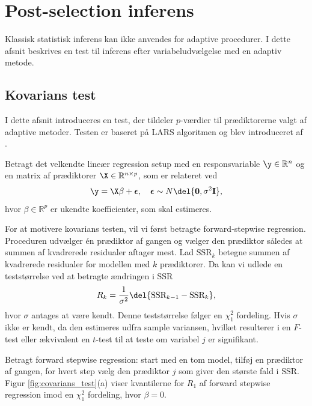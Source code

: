 \section{Post-selection inferens}
Klassisk statistisk inferens kan ikke anvendes for adaptive procedurer.
I dette afsnit beskrives en test til inferens efter variabeludvælgelse med en adaptiv metode.


\subsection{Kovarians test} \label{subsec:kovarians_test}
I dette afsnit introduceres en test, der tildeler \(p\)-værdier til prædiktorerne valgt af adaptive metoder.
Testen er baseret på LARS algoritmen og blev introduceret af \citep{lockhart}.

Betragt det velkendte lineær regression setup med en responsvariable \(\y \in \mathbb{R}^n\) og en matrix af prædiktorer \(\X \in \mathbb{R}^{n \times p}\), som er relateret ved
\begin{align*}
\y = \X \beta + \boldsymbol{\epsilon}, \quad \boldsymbol{\epsilon} \sim N\del{\mathbf{0}, \sigma^2 \mathbf{I}},
\end{align*}
hvor \(\beta \in \mathbb{R}^p\) er ukendte koefficienter, som skal estimeres.

For at motivere kovarians testen, vil vi først betragte forward-stepwise regression.
Proceduren udvælger én prædiktor af gangen og vælger den prædiktor således at summen af kvadrerede residualer aftager mest.
Lad \(\text{SSR}_k\) betegne summen af kvadrerede residualer for modellen med \(k\) prædiktorer.
Da kan vi udlede en teststørrelse ved at betragte ændringen i SSR
\begin{align*}
R_k = \frac{1}{\sigma^2} \del{\text{SSR}_{k-1} - \text{SSR}_k},
\end{align*}
hvor \(\sigma\) antages at være kendt. 
Denne teststørrelse følger en \(\chi_1^2\) fordeling.
Hvis \(\sigma\) ikke er kendt, da den estimeres udfra sample variansen, hvilket resulterer i en \(F\)-test eller ækvivalent en \(t\)-test til at teste om variabel \(j\) er signifikant.

Betragt forward stepwise regression: start med en tom model, tilføj en prædiktor af gangen, for hvert step vælg den prædiktor \(j\) som giver den største fald i SSR.
Figur \ref{fig:covarians_test}(a) viser kvantilerne for \(R_1\) af forward stepwise regression imod en \(\chi_1^2\) fordeling, hvor \(\beta=0\).
 

